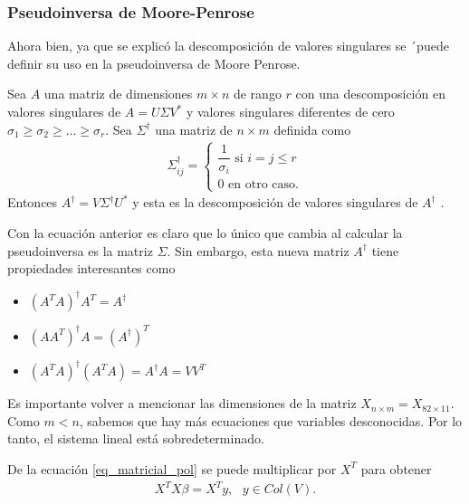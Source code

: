 \subsubsection{Pseudoinversa de Moore-Penrose}
Ahora bien, ya que se explicó la descomposición de valores singulares se ´puede definir su uso en la pseudoinversa de Moore Penrose. 

\begin{theorem}
Sea $A$ una matriz de dimensiones $m \times n$ de rango $r$ con una descomposición en valores singulares de $A = U \Sigma V^{*}$ y valores singulares diferentes de cero $\sigma_1 \geq \sigma_2 \geq \dots \geq \sigma_r$. Sea $\Sigma^{\dagger}$ una matriz de $n \times m$ definida como
\begin{equation*}
    \begin{aligned}
   \Sigma^{\dagger}_{ij} =
   \begin{cases}
   \dfrac{1}{\sigma_i} \text{ si } i = j \leq r\\
   0 \text{ en otro caso.}
   \end{cases}
    \end{aligned}
\end{equation*}
Entonces $A^{\dagger} = V \Sigma^{\dagger} U ^{*}$ y esta es la descomposición de valores singulares de $A^{\dagger}$
\cite[p.~414]{friedberglinearalgebra}.
\end{theorem}

Con la ecuación anterior es claro que lo único que cambia al calcular la pseudoinversa es la matriz $\Sigma$. Sin embargo, esta nueva matriz $A^{\dagger}$ tiene propiedades interesantes como

\begin{itemize}
    \item $(A^{T}A)^{\dagger} A^{T} = A^{\dagger}$
    \item $(AA^{T})^{\dagger} A = (A^{\dagger})^{T}$
    \item $(A^{T}A)^{\dagger}(A^{T}A) = A^{\dagger}A = VV^{T}$
\end{itemize}

Es importante volver a mencionar las dimensiones de la matriz $X_{n \times m} = X_{82 \times 11}$. Como $m < n$, sabemos que hay más ecuaciones que variables desconocidas. Por lo tanto, el sistema lineal está sobredeterminado. 

De la ecuación \ref{eq_matricial_pol} se puede multiplicar por $X^{T}$ para obtener
\begin{equation}
\label{transformacion_eq_base}
    \begin{aligned}
    X^{T}X \beta = X^{T} y, \text{ } y \in Col(V).
    \end{aligned}
\end{equation}

